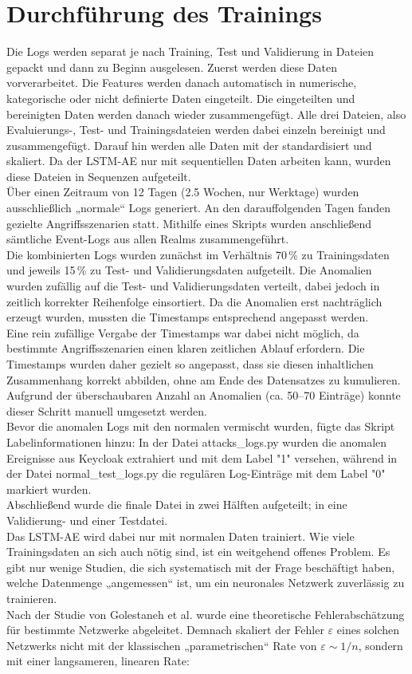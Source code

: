 \documentclass[a4paper,12pt]{article}
\begin{document}
	\section{Durchführung des Trainings}
	Die Logs werden separat je nach Training, Test und Validierung in Dateien gepackt und dann zu Beginn ausgelesen. Zuerst werden diese Daten vorverarbeitet. Die Features werden danach automatisch in numerische, kategorische oder nicht definierte Daten eingeteilt. Die eingeteilten und bereinigten Daten werden danach wieder zusammengefügt. Alle drei Dateien, also Evaluierungs-, Test- und Trainingsdateien werden dabei einzeln bereinigt und zusammengefügt. Darauf hin werden alle Daten mit der standardisiert und skaliert. Da der LSTM-AE nur mit sequentiellen Daten arbeiten kann, wurden diese Dateien in Sequenzen aufgeteilt.
	\\[0.5em]
	Über einen Zeitraum von 12 Tagen (2.5 Wochen, nur Werktage) wurden ausschließlich „normale“ Logs generiert. An den darauffolgenden Tagen fanden gezielte Angriffsszenarien statt. Mithilfe eines Skripts wurden anschließend sämtliche Event-Logs aus allen Realms zusammengeführt.
	\\[0.5em]
	Die kombinierten Logs wurden zunächst im Verhältnis 70\,\% zu Trainingsdaten und jeweils 15\,\% zu Test- und Validierungsdaten aufgeteilt. Die Anomalien wurden zufällig auf die Test- und Validierungsdaten verteilt, dabei jedoch in zeitlich korrekter Reihenfolge einsortiert. Da die Anomalien erst nachträglich erzeugt wurden, mussten die Timestamps entsprechend angepasst werden.
	\\[0.5em]
	Eine rein zufällige Vergabe der Timestamps war dabei nicht möglich, da bestimmte Angriffsszenarien einen klaren zeitlichen Ablauf erfordern. Die Timestamps wurden daher gezielt so angepasst, dass sie diesen inhaltlichen Zusammenhang korrekt abbilden, ohne am Ende des Datensatzes zu kumulieren. Aufgrund der überschaubaren Anzahl an Anomalien (ca. 50–70 Einträge) konnte dieser Schritt manuell umgesetzt werden.
	\\[0.5em]
	Bevor die anomalen Logs mit den normalen vermischt wurden, fügte das Skript Labelinformationen hinzu: In der Datei attacks\_logs.py wurden die anomalen Ereignisse aus Keycloak extrahiert und mit dem Label "1" versehen, während in der Datei normal\_test\_logs.py die regulären Log-Einträge mit dem Label "0" markiert wurden.
	\\[0.5em]
	Abschließend wurde die finale Datei in zwei Hälften aufgeteilt; in eine Validierung- und einer Testdatei.
	\\[0.5em]
	Das LSTM-AE wird dabei nur mit normalen Daten trainiert. Wie viele Trainingsdaten an sich auch nötig sind, ist ein weitgehend offenes Problem. Es gibt nur wenige Studien, die sich systematisch mit der Frage beschäftigt haben, welche Datenmenge „angemessen“ ist, um ein neuronales Netzwerk zuverlässig zu trainieren.
	\\[0.5em]
	Nach der Studie von Golestaneh et al. \cite{Golestaneh2021} wurde eine theoretische Fehlerabschätzung für bestimmte Netzwerke abgeleitet. Demnach skaliert der Fehler $\varepsilon$ eines solchen Netzwerks nicht mit der klassischen „parametrischen“ Rate von $\varepsilon \sim 1/n$, sondern mit einer langsameren, linearen Rate:
	
\end{document}
